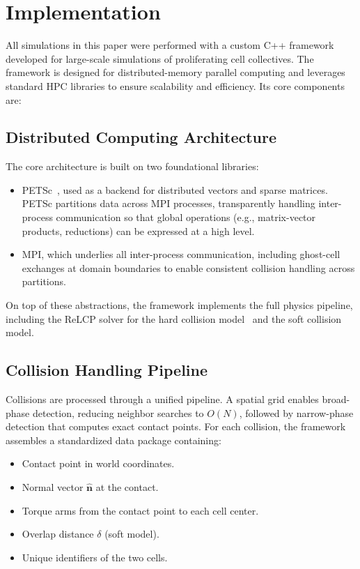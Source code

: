 \documentclass[conference]{IEEEtran}
\begin{document}
\newpage

\section{Implementation}

All simulations in this paper were performed with a custom C++ framework developed for large-scale simulations of proliferating cell collectives. The framework is designed for distributed-memory parallel computing and leverages standard HPC libraries to ensure scalability and efficiency. Its core components are:

\subsection{Distributed Computing Architecture}

The core architecture is built on two foundational libraries:
\begin{itemize}
    \item PETSc~\cite{petsc-web-page}, used as a backend for distributed vectors and sparse matrices. PETSc partitions data across MPI processes, transparently handling inter-process communication so that global operations (e.g., matrix-vector products, reductions) can be expressed at a high level.
    \item MPI, which underlies all inter-process communication, including ghost-cell exchanges at domain boundaries to enable consistent collision handling across partitions.
\end{itemize}

On top of these abstractions, the framework implements the full physics pipeline, including the ReLCP solver for the hard collision model~\cite{Weady2024} and the soft collision model.


\subsection{Collision Handling Pipeline}

Collisions are processed through a unified pipeline. A spatial grid enables broad-phase detection, reducing neighbor searches to $O(N)$, followed by narrow-phase detection that computes exact contact points. For each collision, the framework assembles a standardized data package containing:

\begin{itemize}
    \item Contact point in world coordinates.
    \item Normal vector $\hat{\mathbf{n}}$ at the contact.
    \item Torque arms from the contact point to each cell center.
    \item Overlap distance $\delta$ (soft model).
    \item Unique identifiers of the two cells.
\end{itemize}
\end{document}
